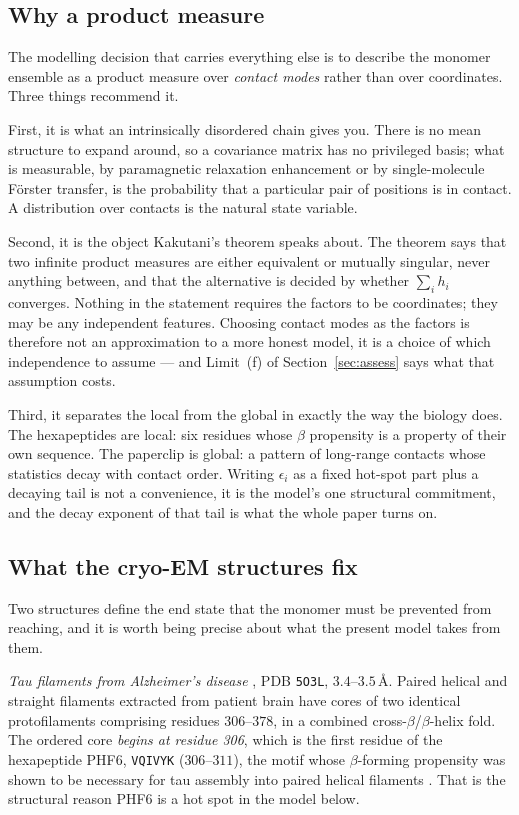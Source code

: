 \documentclass[11pt,reqno]{amsart}
\theoremstyle{plain}
\theoremstyle{definition}
\theoremstyle{remark}
\numberwithin{equation}{section}
\begin{document}
\subsection{Why a product measure}
The modelling decision that carries everything else is to describe the monomer ensemble as a product measure over \emph{contact modes} rather than over coordinates. Three things recommend it.

First, it is what an intrinsically disordered chain gives you. There is no mean structure to expand around, so a covariance matrix has no privileged basis; what is measurable, by paramagnetic relaxation enhancement or by single-molecule F\"orster transfer, is the probability that a particular pair of positions is in contact. A distribution over contacts is the natural state variable.

Second, it is the object Kakutani's theorem speaks about. The theorem \cite{Kakutani1948} says that two infinite product measures are either equivalent or mutually singular, never anything between, and that the alternative is decided by whether $\sum_i h_i$ converges. Nothing in the statement requires the factors to be coordinates; they may be any independent features. Choosing contact modes as the factors is therefore not an approximation to a more honest model, it is a choice of which independence to assume --- and Limit~(f) of Section~\ref{sec:assess} says what that assumption costs.

Third, it separates the local from the global in exactly the way the biology does. The hexapeptides are local: six residues whose $\beta$ propensity is a property of their own sequence. The paperclip is global: a pattern of long-range contacts whose statistics decay with contact order. Writing $\epsilon_i$ as a fixed hot-spot part plus a decaying tail is not a convenience, it is the model's one structural commitment, and the decay exponent of that tail is what the whole paper turns on.

\subsection{What the cryo-EM structures fix}
\label{sec:cryoem}
Two structures define the end state that the monomer must be prevented from reaching, and it is worth being precise about what the present model takes from them.

\emph{Tau filaments from Alzheimer's disease} \cite{Fitzpatrick2017}, PDB \texttt{5O3L}, $3.4$--$3.5$\,\AA. Paired helical and straight filaments extracted from patient brain have cores of two identical protofilaments comprising residues $306$--$378$, in a combined cross-$\beta$/$\beta$-helix fold. The ordered core \emph{begins at residue 306}, which is the first residue of the hexapeptide PHF6, \texttt{VQIVYK} ($306$--$311$), the motif whose $\beta$-forming propensity was shown to be necessary for tau assembly into paired helical filaments \cite{vonBergen2000}. That is the structural reason PHF6 is a hot spot in the model below.
\end{document}
